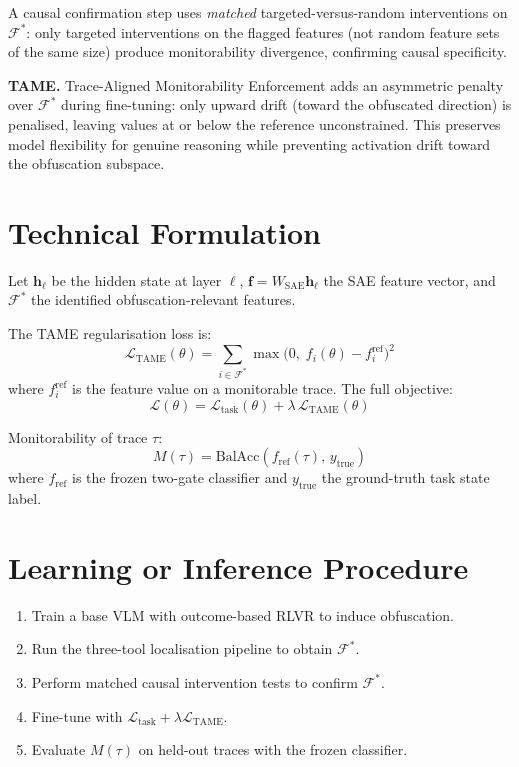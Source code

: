 \documentclass[10pt,twocolumn]{article}
\begin{document}
A causal confirmation step uses \emph{matched} targeted-versus-random
interventions on $\mathcal{F}^*$: only targeted interventions on the
flagged features (not random feature sets of the same size) produce
monitorability divergence, confirming causal specificity.

\textbf{TAME.} Trace-Aligned Monitorability Enforcement adds an asymmetric
penalty over $\mathcal{F}^*$ during fine-tuning: only upward drift (toward
the obfuscated direction) is penalised, leaving values at or below the
reference unconstrained. This preserves model flexibility for genuine
reasoning while preventing activation drift toward the obfuscation subspace.

\section{Technical Formulation}

Let $\mathbf{h}_\ell$ be the hidden state at layer $\ell$, $\mathbf{f} =
W_{\mathrm{SAE}}\mathbf{h}_\ell$ the SAE feature vector, and
$\mathcal{F}^*$ the identified obfuscation-relevant features.

The TAME regularisation loss is:
\[
\mathcal{L}_{\mathrm{TAME}}(\theta)
= \sum_{i \in \mathcal{F}^*}
  \max\!\bigl(0,\; f_i(\theta) - f_i^{\mathrm{ref}}\bigr)^2
\]
where $f_i^{\mathrm{ref}}$ is the feature value on a monitorable trace.
The full objective:
\[
\mathcal{L}(\theta)
= \mathcal{L}_{\mathrm{task}}(\theta)
+ \lambda\,\mathcal{L}_{\mathrm{TAME}}(\theta)
\]

Monitorability of trace $\tau$:
\[
M(\tau) = \mathrm{BalAcc}\!\left(f_{\mathrm{ref}}(\tau),\, y_{\mathrm{true}}\right)
\]
where $f_{\mathrm{ref}}$ is the frozen two-gate classifier and
$y_{\mathrm{true}}$ the ground-truth task state label.

\section{Learning or Inference Procedure}

\begin{enumerate}[itemsep=2pt,parsep=0pt]
  \item Train a base VLM with outcome-based RLVR to induce obfuscation.
  \item Run the three-tool localisation pipeline to obtain $\mathcal{F}^*$.
  \item Perform matched causal intervention tests to confirm $\mathcal{F}^*$.
  \item Fine-tune with $\mathcal{L}_{\mathrm{task}} +
    \lambda\mathcal{L}_{\mathrm{TAME}}$.
  \item Evaluate $M(\tau)$ on held-out traces with the frozen classifier.
\end{enumerate}
\end{document}
